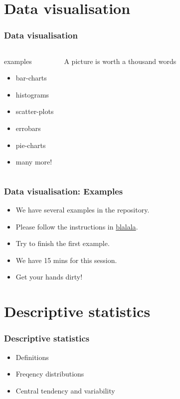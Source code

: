 \documentclass[10pt, compress]{beamer}
\begin{document}
\section{Data visualisation}

\begin{frame}
    \frametitle{Data visualisation}
    \begin{columns}
        \begin{block}{examples}
            \begin{itemize}
                \item{bar-charts}
                \item{histograms}
                \item{scatter-plots}
                \item{errobars}
                \item{pie-charts}
                \item{many more!}
            \end{itemize}
        \end{block}
        \begin{block}{}
            \alert{\huge A picture is worth a thousand words}
        \end{block}
    \end{columns}
\end{frame}

\begin{frame}
    \frametitle{Data visualisation: Examples}
    \begin{itemize}
        \item We have several examples in the repository.
        \item Please follow the instructions in \url{blalala}.
        \item Try to finish the first example.
        \item We have 15 mins for this session.
        \item Get your hands dirty!
    \end{itemize}
\end{frame}

\section{Descriptive statistics}

\begin{frame}
    \frametitle{Descriptive statistics}
    \begin{itemize}
        \item Definitions
        \item Freqency distributions
        \item Central tendency and variability
    \end{itemize}
\end{frame}
\end{document}
